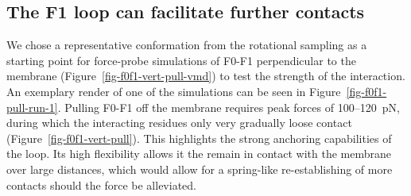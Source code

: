 \documentclass[
  letterpaper,
  DIV=11,
  numbers=noendperiod]{scrartcl}
\begin{document}
\hypertarget{the-f1-loop-can-facilitate-further-contacts}{%
\subsection{The F1 loop can facilitate further
contacts}\label{the-f1-loop-can-facilitate-further-contacts}}

We chose a representative conformation from the rotational sampling as a
starting point for force-probe simulations of F0-F1 perpendicular to the
membrane (Figure~\ref{fig-f0f1-vert-pull-vmd}) to test the strength of
the interaction. An exemplary render of one of the simulations can be
seen in Figure~\ref{fig-f0f1-pull-run-1}. Pulling F0-F1 off the membrane
requires peak forces of 100--120~pN, during which the interacting
residues only very gradually loose contact
(Figure~\ref{fig-f0f1-vert-pull}). This highlights the strong anchoring
capabilities of the loop. Its high flexibility allows it the remain in
contact with the membrane over large distances, which would allow for a
spring-like re-establishing of more contacts should the force be
alleviated.
\end{document}

